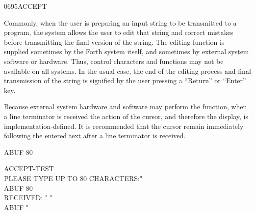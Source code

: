 \begin{worddef}{0695}{ACCEPT}
\begin{rationale}
		Commonly, when the user is preparing an input string to be
		transmitted to a program, the system allows the user to edit
		that string and correct mistakes before transmitting the final
		version of the string. The editing function is supplied
		sometimes by the Forth system itself, and sometimes by external
		system software or hardware. Thus, control characters and
		functions may not be available on all systems. In the usual
		case, the end of the editing process and final transmission of
		the string is signified by the user pressing a ``Return'' or
		``Enter'' key.

		Because external system hardware and software may perform the
		 function, when a line terminator is received the
		action of the cursor, and therefore the display, is
		implementation-defined. It is recommended that the cursor remain
		immediately following the entered text after a line terminator
		is received.
	\end{rationale}

	\begin{testing} %
		\ttfamily
		 ABUF 80  

		\word{:} ACCEPT-TEST \\
		\tab[2]   PLEASE TYPE UP TO 80 CHARACTERS:"  \\
		\tab[2] ABUF 80  \\
		\tab[2]   RECEIVED: " \word{[CHAR]} "  \\
		\tab[2] ABUF   \word{[CHAR]} "   \\
		\word{;}

	\end{testing}
\end{worddef}


